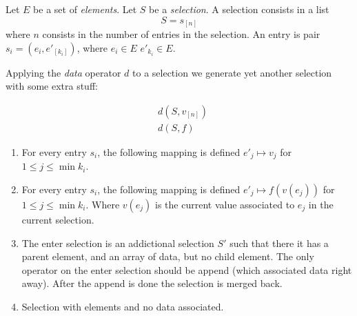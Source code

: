 \documentclass{article}
\begin{document}
\newcommand{\Parent}{{\tt parent}}
\newcommand{\List}{{\tt list}}
\newcommand{\Nat}{{\bf N}}

\noindent Let $E$ be a set of {\em elements}. Let $S$ be a {\em
  selection}. A selection consists in a list $$S = s_{[n]}$$ where $n$
consists in the number of entries in the selection. An entry is pair
$s_i = (e_i, e'_{[k_i]})$, where $e_i \in E$ $e'_{k_i} \in E$.

Applying the {\em data} operator $d$ to a selection we generate
yet another selection with some extra stuff:

\begin{align}
&d(S,v_{[n]})\\
&d(S, f )
\end{align}

\begin{enumerate}
\item[{\bf [value-mapping-(1)]}] For every entry $s_i$, the following
  mapping is defined $ e'_j \mapsto v_j $ for $1 \leq j \leq
  \min{k_i}$. 
\item[{\bf [value-mapping-(2)]}] For every entry $s_i$, the following
  mapping is defined $ e'_j \mapsto f( v(e_j) )$ for $1 \leq j \leq
  \min{k_i}$. Where $v(e_j)$ is the current value associated to $e_j$
  in the current selection.
\item[{\bf [enter]}] The enter selection is an addictional selection
  $S'$ such that there it has a parent element, and an array of data,
  but no child element. The only operator on the enter selection should
  be append (which associated data right away). After the append is done
  the selection is merged back.
\item[{\bf [exit]}] Selection with elements and no data associated.
\end{enumerate}
\end{document}
